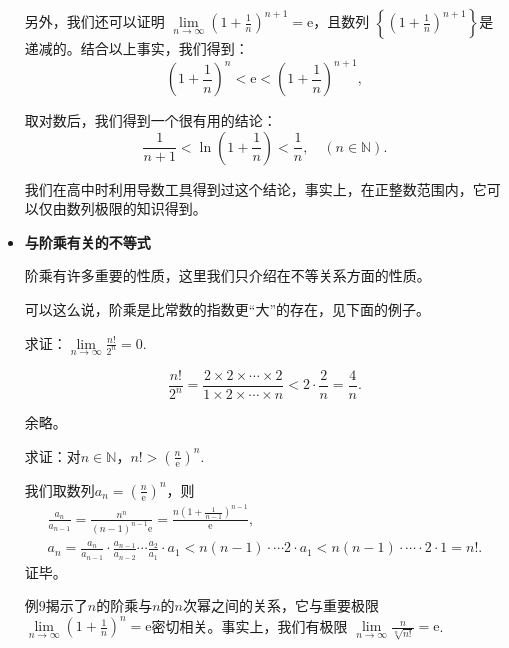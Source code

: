\begin{itemize}
          另外，我们还可以证明 $\lim\limits_{n \to \infty}\left (1+\frac{1}{n}\right )^{n+1}=\mathrm e$，且数列
          $\left\{  \left (1+\frac{1}{n}\right )^{n+1} \right\}  $是递减的。结合以上事实，我们得到：
          \[
              \left (1+\frac{1}{n}\right )^n<\mathrm e<\left (1+\frac{1}{n}\right )^{n+1\!\!\!\!\!\!\!\!\!\!\!\!}
              ,\]


          取对数后，我们得到一个很有用的结论：
          \[
              \frac{1}{n+1}<\ln \left( 1+\frac{1}{n} \right) <\frac{1}{n}, \quad (n\in \mathbb{N} ).
          \]


          我们在高中时利用导数工具得到过这个结论，事实上，在正整数范围内，它可以仅由数列极限的知识得到。

    \item \textbf{与阶乘有关的不等式}

          阶乘有许多重要的性质，这里我们只介绍在不等关系方面的性质。

          可以这么说，阶乘是比常数的指数更“大”的存在，见下面的例子。
          \begin{example}
              求证：$\lim\limits_{n \to \infty} \frac{n!}{2^n} =0$.
          \end{example}
          \begin{prove}
              \[
                  \frac{n!}{2^n}=\frac{2\times 2\times \cdots\times 2}{1\times 2\times \cdots\times n}
                  <2\cdot \frac{2}{n}=\frac{4}{n}
                  .\]

              余略。
          \end{prove}


          \begin{example}
              求证：对$n\in \mathbb{N}$，$n!>\left (\frac{n}{\mathrm e} \right )^n$.
          \end{example}
          \begin{prove}
              我们取数列$a_n=\left (\frac{n}{\mathrm e} \right )^n$，则
              \begin{gather}
                  \frac{a_n}{a_{n-1}}=\frac{n^n}{(n-1)^{n-1}\mathrm e}=\frac{n\left (1+\frac{1}{n-1}\right )^{n-1}}{\mathrm e},\\
                  a_n=\frac{a_n}{a_{n-1}} \cdot \frac{a_{n-1}}{a_{n-2}}\cdots \frac{a_2}{a_1} \cdot a_1< n(n-1)\cdot \cdots 2\cdot a_1<n(n-1)\cdot \cdots \cdot 2\cdot 1=n!.
              \end{gather}
              证毕。
          \end{prove}

          例9揭示了$n$的阶乘与$n$的$n$次幂之间的关系，它与重要极限$\lim\limits_{n \to \infty}\left (1
              +\frac{1}{n}\right )^n=\mathrm e$密切相关。事实上，我们有极限
          $\lim\limits_{n \to \infty}\frac{n}{\sqrt[n]{n!}}=\mathrm e$.
\end{itemize}

